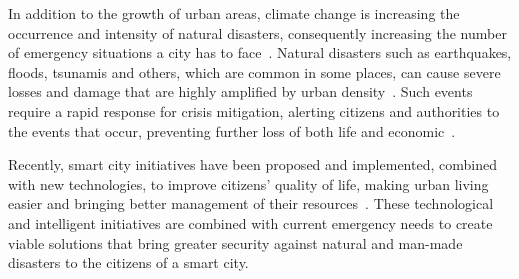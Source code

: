 \begin{refsection}

In addition to the growth of urban areas, climate change is increasing the occurrence and intensity of natural disasters, consequently increasing the number of emergency situations a city has to face~\cite{boukerche2018smart}. Natural disasters such as earthquakes, floods, tsunamis and others, which are common in some places, can cause severe losses and damage that are highly amplified by urban density~\cite{Gosavi2020582}. Such events require a rapid response for crisis mitigation, alerting citizens and authorities to the events that occur, preventing further loss of both life and economic~\cite{Costa_2019}.


Recently, smart city initiatives have been proposed and implemented, combined with new technologies, to improve citizens' quality of life, making urban living easier and bringing better management of their resources~\cite{Alkhatib2019771}. These technological and intelligent initiatives are combined with current emergency needs to create viable solutions that bring greater security against natural and man-made disasters to the citizens of a smart city.



\end{refsection}
